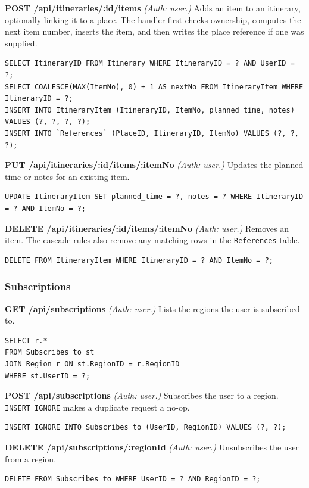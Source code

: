 \textbf{POST /api/itineraries/:id/items} \textit{(Auth: user.)}
Adds an item to an itinerary, optionally linking it to a place. The handler first checks ownership, computes the next item number, inserts the item, and then writes the place reference if one was supplied.
\begin{lstlisting}[language=MySQL]
SELECT ItineraryID FROM Itinerary WHERE ItineraryID = ? AND UserID = ?;
SELECT COALESCE(MAX(ItemNo), 0) + 1 AS nextNo FROM ItineraryItem WHERE ItineraryID = ?;
INSERT INTO ItineraryItem (ItineraryID, ItemNo, planned_time, notes) VALUES (?, ?, ?, ?);
INSERT INTO `References` (PlaceID, ItineraryID, ItemNo) VALUES (?, ?, ?);
\end{lstlisting}

\textbf{PUT /api/itineraries/:id/items/:itemNo} \textit{(Auth: user.)}
Updates the planned time or notes for an existing item.
\begin{lstlisting}[language=MySQL]
UPDATE ItineraryItem SET planned_time = ?, notes = ? WHERE ItineraryID = ? AND ItemNo = ?;
\end{lstlisting}

\textbf{DELETE /api/itineraries/:id/items/:itemNo} \textit{(Auth: user.)}
Removes an item. The cascade rules also remove any matching rows in the \texttt{References} table.
\begin{lstlisting}[language=MySQL]
DELETE FROM ItineraryItem WHERE ItineraryID = ? AND ItemNo = ?;
\end{lstlisting}

\subsubsection{Subscriptions}

\textbf{GET /api/subscriptions} \textit{(Auth: user.)}
Lists the regions the user is subscribed to.
\begin{lstlisting}[language=MySQL]
SELECT r.*
FROM Subscribes_to st
JOIN Region r ON st.RegionID = r.RegionID
WHERE st.UserID = ?;
\end{lstlisting}

\textbf{POST /api/subscriptions} \textit{(Auth: user.)}
Subscribes the user to a region. \texttt{INSERT IGNORE} makes a duplicate request a no-op.
\begin{lstlisting}[language=MySQL]
INSERT IGNORE INTO Subscribes_to (UserID, RegionID) VALUES (?, ?);
\end{lstlisting}

\textbf{DELETE /api/subscriptions/:regionId} \textit{(Auth: user.)}
Unsubscribes the user from a region.
\begin{lstlisting}[language=MySQL]
DELETE FROM Subscribes_to WHERE UserID = ? AND RegionID = ?;
\end{lstlisting}

